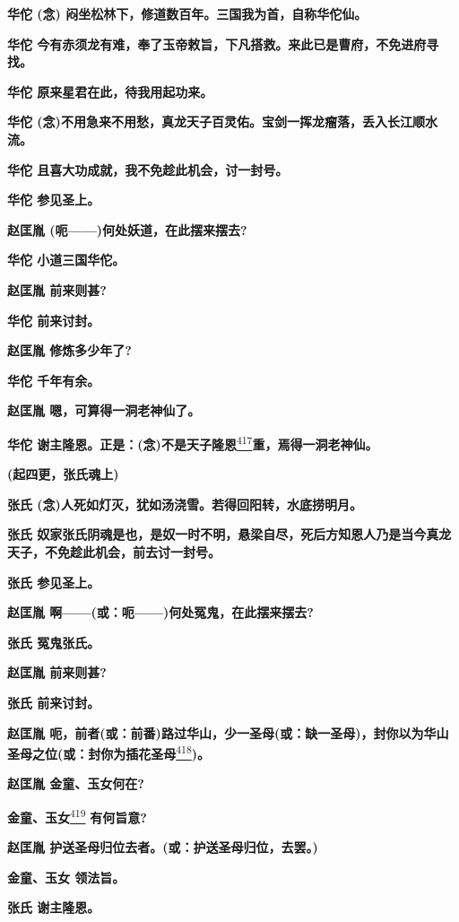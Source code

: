 \textbf{华佗 (念) 闷坐松林下，修道数百年。三国我为首，自称华佗仙。}

\textbf{华佗
今有赤须龙有难，奉了玉帝敕旨，下凡搭救。来此已是曹府，不免进府寻找。}

\textbf{华佗 原来星君在此，待我用起功来。}

\textbf{华佗
(念)不用急来不用愁，真龙天子百灵佑。宝剑一挥龙瘤落，丢入长江顺水流。}

\textbf{华佗 且喜大功成就，我不免趁此机会，讨一封号。}

\textbf{华佗 参见圣上。}

\textbf{赵匡胤 (呃------)何处妖道，在此摆来摆去?}

\textbf{华佗 小道三国华佗。}

\textbf{赵匡胤 前来则甚?}

\textbf{华佗 前来讨封。}

\textbf{赵匡胤 修炼多少年了?}

\textbf{华佗 千年有余。}

\textbf{赵匡胤 嗯，可算得一洞老神仙了。}

\textbf{华佗
谢主隆恩。正是：(念)不是天子隆恩}\protect\hyperlink{fn417}{\textsuperscript{417}}\textbf{重，焉得一洞老神仙。}

\textbf{(起四更，张氏魂上)}

\textbf{张氏 (念)人死如灯灭，犹如汤浇雪。若得回阳转，水底捞明月。}

\textbf{张氏
奴家张氏阴魂是也，是奴一时不明，悬梁自尽，死后方知恩人乃是当今真龙天子，不免趁此机会，前去讨一封号。}

\textbf{张氏 参见圣上。}

\textbf{赵匡胤 啊------(或：呃------)何处冤鬼，在此摆来摆去?}

\textbf{张氏 冤鬼张氏。}

\textbf{赵匡胤 前来则甚?}

\textbf{张氏 前来讨封。}

\textbf{赵匡胤
呃，前者(或：前番)路过华山，少一圣母(或：缺一圣母)，封你以为华山圣母之位(或：封你为插花圣母}\protect\hyperlink{fn418}{\textsuperscript{418}}\textbf{)。}

\textbf{赵匡胤 金童、玉女何在?}

\textbf{金童、玉女}\protect\hyperlink{fn419}{\textsuperscript{419}}
\textbf{有何旨意?}

\textbf{赵匡胤 护送圣母归位去者。(或：护送圣母归位，去罢。)}

\textbf{金童、玉女 领法旨。}

\textbf{张氏 谢主隆恩。}

